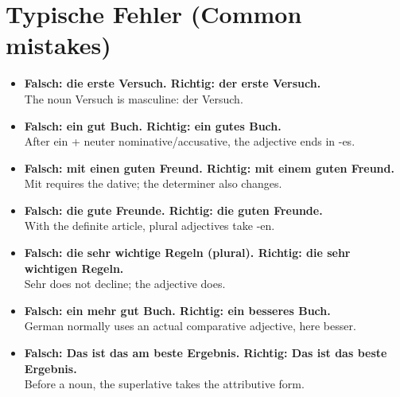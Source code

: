 \documentclass[a4paper,11pt]{article}
\newcommand{\ExampleItem}[2]{\item \textbf{#1}\\{\small\color{SoftGray}#2}}
\begin{document}
\section{Typische Fehler \textnormal{(Common mistakes)}}
\begin{exbox}\begin{itemize}
\ExampleItem{Falsch: die erste Versuch. \quad Richtig: der erste Versuch.}{The noun Versuch is masculine: der Versuch.}
\ExampleItem{Falsch: ein gut Buch. \quad Richtig: ein gutes Buch.}{After ein + neuter nominative/accusative, the adjective ends in -es.}
\ExampleItem{Falsch: mit einen guten Freund. \quad Richtig: mit einem guten Freund.}{Mit requires the dative; the determiner also changes.}
\ExampleItem{Falsch: die gute Freunde. \quad Richtig: die guten Freunde.}{With the definite article, plural adjectives take -en.}
\ExampleItem{Falsch: die sehr wichtige Regeln (plural). \quad Richtig: die sehr wichtigen Regeln.}{Sehr does not decline; the adjective does.}
\ExampleItem{Falsch: ein mehr gut Buch. \quad Richtig: ein besseres Buch.}{German normally uses an actual comparative adjective, here besser.}
\ExampleItem{Falsch: Das ist das am beste Ergebnis. \quad Richtig: Das ist das beste Ergebnis.}{Before a noun, the superlative takes the attributive form.}
\end{itemize}\end{exbox}
\end{document}
